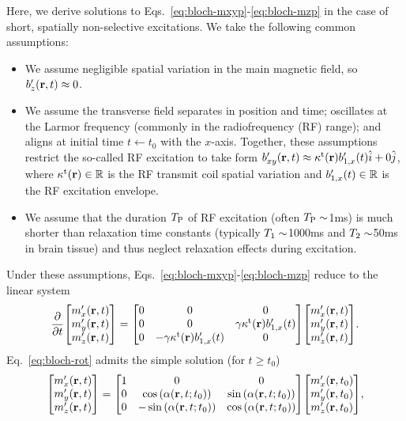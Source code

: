 Here,
we derive solutions 
to Eqs.~\eqref{eq:bloch-mxyp}-\eqref{eq:bloch-mzp}
in the case of short, spatially non-selective excitations.
We take the following common assumptions:
\begin{itemize}
	\item 
		We assume negligible spatial variation
		in the main magnetic field, 
		so $\bzp\prt \approx 0$.
	\item 
		We assume the transverse field
		separates in position and time;
		oscillates at the Larmor frequency
		(commonly in the radiofrequency (RF) range);
		and aligns at initial time $t \gets t_0$ 
		with the $x$-axis.
		Together,
		these assumptions restrict
		the so-called RF excitation to take form
		$\bxyp\prt \approx \stx\pr \bonexp\pt \unit{i} + 0\unit{j}$,
		where $\stx\pr \in \real$ is the RF transmit coil spatial variation
		and $\bonexp\pt \in \real$ is the RF excitation envelope.
	\item
		We assume that 
		the duration $T_\mathrm{P}$
		of RF excitation
		(often $T_\mathrm{P}\sim$1ms)
		is much shorter than relaxation time constants
		(typically $T_1\sim$1000ms and $T_2\sim$50ms
		in brain tissue)
		and thus neglect relaxation effects
		during excitation.
\end{itemize}
Under these assumptions, 
Eqs.~\eqref{eq:bloch-mxyp}-\eqref{eq:bloch-mzp}
reduce to the linear system
\begin{align}
	\dela{t}
	\begin{bmatrix}
		\mxp\prt \\
		\myp\prt \\
		\mzp\prt
	\end{bmatrix}
	=
	\begin{bmatrix}
		0 & 0 & 0 \\
		0 & 0 & \gam \stx\pr \bonexp\pt \\
		0 & -\gam \stx\pr \bonexp\pt & 0
	\end{bmatrix}
	\begin{bmatrix}
		\mxp\prt \\
		\myp\prt \\
		\mzp\prt
	\end{bmatrix}.
	\label{eq:bloch-rot}
\end{align}
Eq.~\eqref{eq:bloch-rot} admits the simple solution
(for $t\geq t_0$)
\begin{align}
	\begin{bmatrix}
		\mxp\prt \\
		\myp\prt \\
		\mzp\prt
	\end{bmatrix}
	= 
	\begin{bmatrix}
		1 & 0 & 0 \\
		0 & \cosa{\fliprt} & \sina{\fliprt} \\
		0 & -\sina{\fliprt} & \cosa{\fliprt} 
	\end{bmatrix}
	\begin{bmatrix}
		\mxp\prtz \\
		\myp\prtz \\
		\mzp\prtz
	\end{bmatrix},
	\label{eq:rot-sol}
\end{align}
